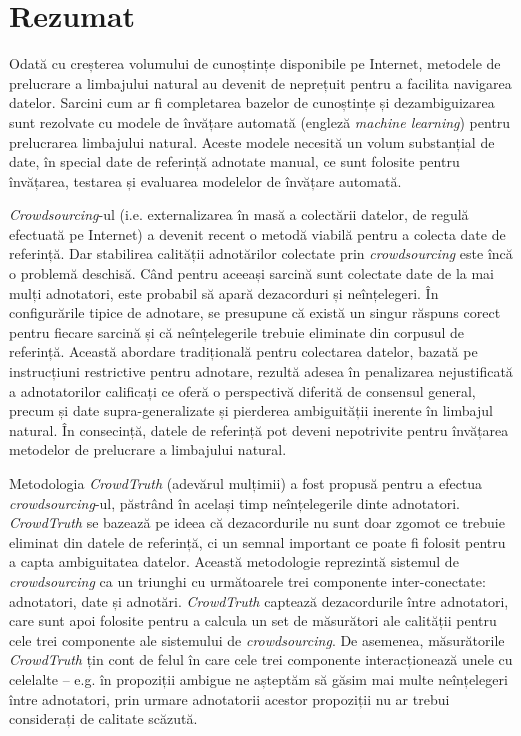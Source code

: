 \manualmark
{}

\chapter*{Rezumat}

Odată cu creșterea volumului de cunoștințe disponibile pe Internet, metodele de prelucrare a limbajului natural au devenit de neprețuit pentru a facilita navigarea datelor. Sarcini cum ar fi completarea bazelor de cunoștințe și dezambiguizarea sunt rezolvate cu modele de învățare automată (engleză \textit{machine learning}) pentru prelucrarea limbajului natural. Aceste modele necesită un volum substanțial de date, în special date de referință adnotate manual, ce sunt folosite pentru învățarea, testarea și evaluarea modelelor de învățare automată.

\textit{Crowdsourcing}-ul (i.e. externalizarea în masă a colectării datelor, de regulă efectuată pe Internet) a devenit recent o metodă viabilă pentru a colecta date de referință. Dar stabilirea calității adnotărilor colectate prin \textit{crowdsourcing} este încă o problemă deschisă. Când pentru aceeași sarcină sunt colectate date de la mai mulți adnotatori, este probabil să apară dezacorduri și neînțelegeri. În configurările tipice de adnotare, se presupune că există un singur răspuns corect pentru fiecare sarcină și că neînțelegerile trebuie eliminate din corpusul de referință. Această abordare tradițională pentru colectarea datelor, bazată pe instrucțiuni restrictive pentru adnotare, rezultă adesea în penalizarea nejustificată a adnotatorilor calificați ce oferă o perspectivă diferită de consensul general, precum și date supra-generalizate și pierderea ambiguității inerente în limbajul natural. În consecință, datele de referință pot deveni nepotrivite pentru învățarea metodelor de prelucrare a limbajului natural.

Metodologia \textit{CrowdTruth} (adevărul mulțimii) a fost propusă pentru a efectua \textit{crowdsourcing}-ul, păstrând în același timp neînțelegerile dinte adnotatori. \textit{CrowdTruth} se bazează pe ideea că dezacordurile nu sunt doar zgomot ce trebuie eliminat din datele de referință, ci un semnal important ce poate fi folosit pentru a capta ambiguitatea datelor. Această metodologie reprezintă sistemul de \textit{crowdsourcing} ca un triunghi cu următoarele trei componente inter-conectate: adnotatori, date și adnotări. \textit{CrowdTruth} captează dezacordurile între adnotatori, care sunt apoi folosite pentru a calcula un set de măsurători ale calității pentru cele trei componente ale sistemului de \textit{crowdsourcing}. De asemenea, măsurătorile \textit{CrowdTruth} țin cont de felul în care cele trei componente interacționează unele cu celelalte -- e.g. în propoziții ambigue ne așteptăm să găsim mai multe neînțelegeri între adnotatori, prin urmare adnotatorii acestor propoziții nu ar trebui considerați de calitate scăzută.


